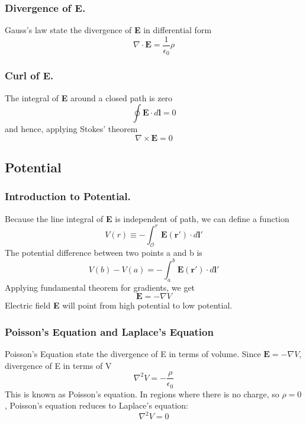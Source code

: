 \documentclass[../../../main.tex]{subfiles}
\begin{document}
\subsubsection{Divergence of E.} Gauss's law state the divergence of \textbf{E} in differential form
\begin{equation*}
    \nabla \cdot \mathbf{E}=\frac{1}{\epsilon_0}\rho
\end{equation*}

\subsubsection{Curl of E.} The integral of \textbf{E} around a closed path is zero
\begin{equation*}
    \oint \mathbf{E} \cdot d\mathbf{l}  =0
\end{equation*}
and hence, applying Stokes' theorem
\begin{equation*}
    \nabla \times \mathbf{E}  =0
\end{equation*}


\subsection{Potential}
\subsubsection{Introduction to Potential.} Because the line integral of \textbf{E} is independent of path, we can define a function
\begin{equation*}
    V(r)\equiv -\int_{\mathcal{O}}^{r} \mathbf{E}(\mathbf{r'})\cdot d\mathbf{l'}
\end{equation*}
The potential difference between two points a and b is
\begin{equation*}
    V (b) - V (a)= -\int_{a}^{b} \mathbf{E}(\mathbf{r'})\cdot d\mathbf{l'}
\end{equation*}
Applying fundamental theorem for gradients, we get
\begin{equation*}
    \mathbf{E} =-\nabla V
\end{equation*}
Electric field \textbf{E} will point from high potential to low potential.

\subsubsection{Poisson's Equation and Laplace's Equation}
Poisson's Equation state the divergence of E in terms of volume.
Since $   \mathbf{E} =-\nabla V$, divergence of E in terms of V
\begin{equation*}
    \nabla^2 V=-\frac{\rho}{\epsilon_0}
\end{equation*}
This is known as Poisson's equation. In regions where there is no charge, so
$\rho = 0$, Poisson's equation reduces to Laplace's equation:
\begin{equation*}
    \nabla^2 V=0
\end{equation*}
\end{document}
